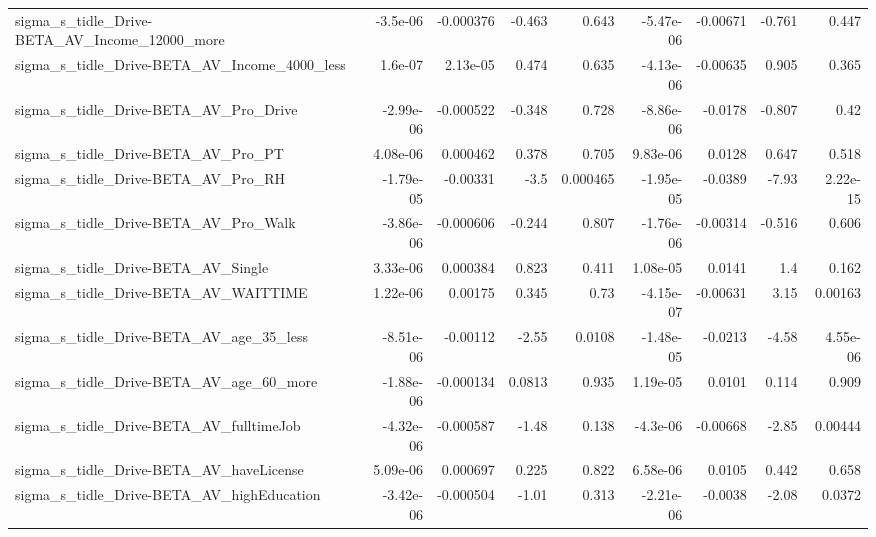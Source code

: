 \begin{tabular}{lrrrrrrrr}
sigma\_s\_tidle\_Drive-BETA\_AV\_Income\_12000\_more      &    -3.5e-06 &    -0.000376 &    -0.463 &    0.643 &  -5.47e-06 &    -0.00671 &       -0.761 &         0.447 \\
sigma\_s\_tidle\_Drive-BETA\_AV\_Income\_4000\_less       &     1.6e-07 &     2.13e-05 &     0.474 &    0.635 &  -4.13e-06 &    -0.00635 &        0.905 &         0.365 \\
sigma\_s\_tidle\_Drive-BETA\_AV\_Pro\_Drive              &   -2.99e-06 &    -0.000522 &    -0.348 &    0.728 &  -8.86e-06 &     -0.0178 &       -0.807 &          0.42 \\
sigma\_s\_tidle\_Drive-BETA\_AV\_Pro\_PT                 &    4.08e-06 &     0.000462 &     0.378 &    0.705 &   9.83e-06 &      0.0128 &        0.647 &         0.518 \\
sigma\_s\_tidle\_Drive-BETA\_AV\_Pro\_RH                 &   -1.79e-05 &     -0.00331 &      -3.5 & 0.000465 &  -1.95e-05 &     -0.0389 &        -7.93 &      2.22e-15 \\
sigma\_s\_tidle\_Drive-BETA\_AV\_Pro\_Walk               &   -3.86e-06 &    -0.000606 &    -0.244 &    0.807 &  -1.76e-06 &    -0.00314 &       -0.516 &         0.606 \\
sigma\_s\_tidle\_Drive-BETA\_AV\_Single                 &    3.33e-06 &     0.000384 &     0.823 &    0.411 &   1.08e-05 &      0.0141 &          1.4 &         0.162 \\
sigma\_s\_tidle\_Drive-BETA\_AV\_WAITTIME               &    1.22e-06 &      0.00175 &     0.345 &     0.73 &  -4.15e-07 &    -0.00631 &         3.15 &       0.00163 \\
sigma\_s\_tidle\_Drive-BETA\_AV\_age\_35\_less            &   -8.51e-06 &     -0.00112 &     -2.55 &   0.0108 &  -1.48e-05 &     -0.0213 &        -4.58 &      4.55e-06 \\
sigma\_s\_tidle\_Drive-BETA\_AV\_age\_60\_more            &   -1.88e-06 &    -0.000134 &    0.0813 &    0.935 &   1.19e-05 &      0.0101 &        0.114 &         0.909 \\
sigma\_s\_tidle\_Drive-BETA\_AV\_fulltimeJob            &   -4.32e-06 &    -0.000587 &     -1.48 &    0.138 &   -4.3e-06 &    -0.00668 &        -2.85 &       0.00444 \\
sigma\_s\_tidle\_Drive-BETA\_AV\_haveLicense            &    5.09e-06 &     0.000697 &     0.225 &    0.822 &   6.58e-06 &      0.0105 &        0.442 &         0.658 \\
sigma\_s\_tidle\_Drive-BETA\_AV\_highEducation          &   -3.42e-06 &    -0.000504 &     -1.01 &    0.313 &  -2.21e-06 &     -0.0038 &        -2.08 &        0.0372 \\

\end{tabular}
